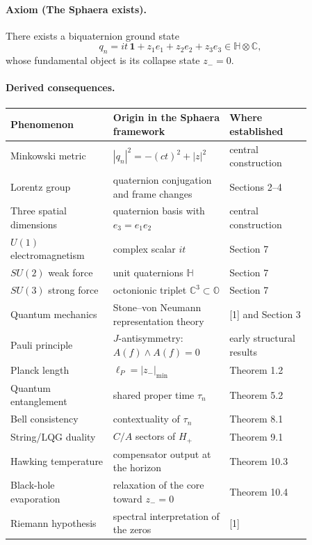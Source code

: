 \paragraph*{Axiom (The Sphaera exists).}
There exists a biquaternion ground state
\[
q_n = it\,\mathbf{1} + z_1 e_1 + z_2 e_2 + z_3 e_3 \in \mathbb{H} \otimes \mathbb{C},
\]
whose fundamental object is its collapse state $z_-=0$.

\paragraph*{Derived consequences.}
\begin{center}
\begin{tabular}{p{0.30\linewidth} p{0.32\linewidth} p{0.24\linewidth}}
\toprule
Phenomenon & Origin in the Sphaera framework & Where established \\
\midrule
Minkowski metric & $|q_n|^2 = -(ct)^2 + |z|^2$ & central construction \\
Lorentz group & quaternion conjugation and frame changes & Sections 2--4 \\
Three spatial dimensions & quaternion basis with $e_3=e_1e_2$ & central construction \\
$U(1)$ electromagnetism & complex scalar $it$ & Section 7 \\
$SU(2)$ weak force & unit quaternions $\mathbb{H}$ & Section 7 \\
$SU(3)$ strong force & octonionic triplet $\mathbb{C}^3 \subset \mathbb{O}$ & Section 7 \\
Quantum mechanics & Stone--von Neumann representation theory & [1] and Section 3 \\
Pauli principle & $J$-antisymmetry: $A(f)\wedge A(f)=0$ & early structural results \\
Planck length & $\ell_P = |z_-|_{\min}$ & Theorem 1.2 \\
Quantum entanglement & shared proper time $\tau_n$ & Theorem 5.2 \\
Bell consistency & contextuality of $\tau_n$ & Theorem 8.1 \\
String/LQG duality & $C/A$ sectors of $H_+$ & Theorem 9.1 \\
Hawking temperature & compensator output at the horizon & Theorem 10.3 \\
Black-hole evaporation & relaxation of the core toward $z_-=0$ & Theorem 10.4 \\
Riemann hypothesis & spectral interpretation of the zeros & [1] \\
\bottomrule
\end{tabular}
\end{center}
